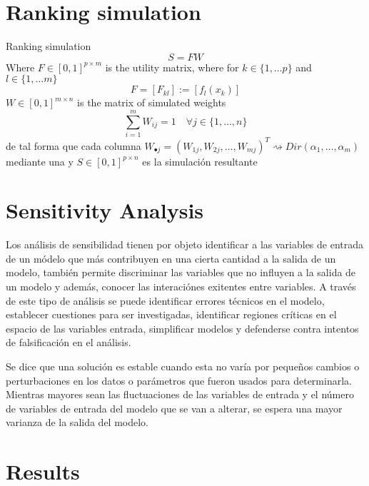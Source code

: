\section{Ranking simulation}
Ranking simulation
\[ S = F W \]
Where $F\in[0,1]^{p\times m}$ is the utility matrix, where for $k\in\{1,\ldots p\}$ and
$l\in\{1,\ldots m\}$
\[ F = [F_{kl}] := [f_l(x_k)] \]
$W\in[0,1]^{m\times n}$ is the matrix of simulated weights
\[ \sum_{i=1}^m W_{ij} = 1 \quad \forall j\in\{1,\ldots,n\}\]
de tal forma que cada columna $W_{\bullet j} = (W_{1j},W_{2j},\ldots,W_{mj})^T\rightsquigarrow
Dir(\alpha_1,\ldots,\alpha_m)$ mediante una
y $S\in[0,1]^{p\times n}$ es la simulación resultante


\section{Sensitivity Analysis}
Los análisis de sensibilidad tienen por objeto identificar a las variables de entrada de un módelo que más contribuyen en una cierta cantidad a la salida de un modelo, también permite discriminar las variables que no influyen a la salida de un modelo y además, conocer las interaciónes exitentes entre variables\citep{4}. A través de este tipo de análisis se puede identificar errores técnicos en el modelo, establecer cuestiones para ser investigadas, identificar regiones críticas en el espacio de las variables entrada, simplificar modelos y defenderse contra intentos de falsificación en el análisis\citep{5}. 

Se dice que una solución es estable cuando esta no varía por pequeños cambios o perturbaciones en los datos o parámetros que fueron usados para determinarla\citep{2}. Mientras mayores sean las fluctuaciones de las variables de entrada y el número de variables de entrada del modelo que se van a alterar, se espera una mayor varianza de la salida del modelo.    


\section{Results}

